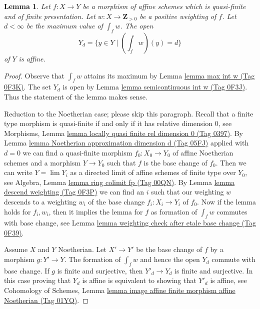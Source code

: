 \documentclass{amsart}
\theoremstyle{plain}
\newtheorem{lemma}[subsection]{Lemma}
\theoremstyle{definition}
\theoremstyle{remark}
\numberwithin{equation}{subsection}
\def\lim{\mathop{\mathrm{lim}}\nolimits}
\begin{document}
\begin{lemma}
\label{lemma-affineness-of-large-open}
Let $f : X \to Y$ be a morphism of affine schemes which is
quasi-finite and of finite presentation.
Let $w : X \to \mathbf{Z}_{> 0}$ be a positive weighting of $f$.
Let $d < \infty$ be the maximum value of $\int_f w$. The open
$$
Y_d = \{y \in Y \mid (\textstyle{\int}_f w)(y) = d \}
$$
of $Y$ is affine.
\end{lemma}

\begin{proof}
Observe that $\int_f w$ attains its maximum by Lemma \href{https://stacks.math.columbia.edu/tag/0F3K}{lemma max int w (Tag 0F3K)}.
The set $Y_d$ is open by Lemma \href{https://stacks.math.columbia.edu/tag/0F3J}{lemma semicontinuous int w (Tag 0F3J)}.
Thus the statement of the lemma makes sense.

\medskip\noindent
Reduction to the Noetherian case; please skip this paragraph.
Recall that a finite type morphism is quasi-finite if and only
if it has relative dimension $0$, see
Morphisms, Lemma \href{https://stacks.math.columbia.edu/tag/0397}{lemma locally quasi finite rel dimension 0 (Tag 0397)}.
By Lemma \href{https://stacks.math.columbia.edu/tag/05FJ}{lemma Noetherian approximation dimension d (Tag 05FJ)}
applied with $d = 0$ we can find a quasi-finite morphism $f_0 : X_0 \to Y_0$
of affine Noetherian schemes and a morphism $Y \to Y_0$ such that $f$
is the base change of $f_0$. Then we can write $Y = \lim Y_i$ as a directed
limit of affine schemes of finite type over $Y_0$, see
Algebra, Lemma \href{https://stacks.math.columbia.edu/tag/00QN}{lemma ring colimit fp (Tag 00QN)}.
By Lemma \href{https://stacks.math.columbia.edu/tag/0F3P}{lemma descend weighting (Tag 0F3P)}
we can find an $i$ such that our weighting $w$
descends to a weighting $w_i$ of the base change $f_i : X_i \to Y_i$
of $f_0$. Now if the lemma holds for $f_i, w_i$, then it implies
the lemma for $f$ as formation of $\int_f w$ commutes with base
change, see Lemma \href{https://stacks.math.columbia.edu/tag/0F39}{lemma weighting check after etale base change (Tag 0F39)}.

\medskip\noindent
Assume $X$ and $Y$ Noetherian. Let $X' \to Y'$ be the base change of $f$
by a morphism $g : Y' \to Y$. The formation of $\int_f w$ and hence
the open $Y_d$ commute with base change. If $g$ is finite and surjective, then
$Y'_d \to Y_d$ is finite and surjective. In this case proving that
$Y_d$ is affine is equivalent to showing that $Y'_d$ is affine, see
Cohomology of Schemes, Lemma
\href{https://stacks.math.columbia.edu/tag/01YQ}{lemma image affine finite morphism affine Noetherian (Tag 01YQ)}.


\end{proof}
\end{document}
